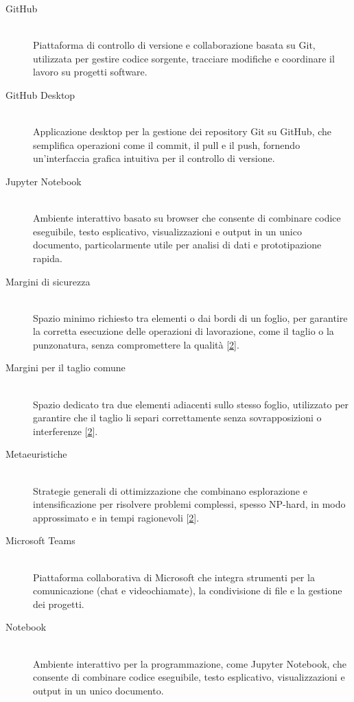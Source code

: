 \begin{description}
    \item[GitHub] \hfill \\
    Piattaforma di controllo di versione e collaborazione basata su Git, utilizzata per gestire codice sorgente, tracciare modifiche e coordinare il lavoro su progetti software.

    \item[GitHub Desktop] \hfil \\
    Applicazione desktop per la gestione dei repository Git su GitHub, che semplifica operazioni come il commit, il pull e il push, fornendo un'interfaccia grafica intuitiva per il controllo di versione.

    \item[Jupyter Notebook] \hfil \\
    Ambiente interattivo basato su browser che consente di combinare codice eseguibile, testo esplicativo, visualizzazioni e output in un unico documento, particolarmente utile per analisi di dati e prototipazione rapida.

    \item[Margini di sicurezza] \hfill \\ \hypertarget{gls2}{}
    Spazio minimo richiesto tra elementi o dai bordi di un foglio, per garantire la corretta esecuzione delle operazioni di lavorazione, come il taglio o la punzonatura, senza compromettere la qualità [\hyperlink{bibliografia}{2}].

    \item[Margini per il taglio comune] \hfill \\
    Spazio dedicato tra due elementi adiacenti sullo stesso foglio, utilizzato per garantire che il taglio li separi correttamente senza sovrapposizioni o interferenze [\hyperlink{bibliografia}{2}].

    \item[Metaeuristiche] \hfill \\
    Strategie generali di ottimizzazione che combinano esplorazione e intensificazione per risolvere problemi complessi, spesso NP-hard, in modo approssimato e in tempi ragionevoli [\hyperlink{bibliografia}{2}].

    \item[Microsoft Teams] \hfill \\
    Piattaforma collaborativa di Microsoft che integra strumenti per la comunicazione (chat e videochiamate), la condivisione di file e la gestione dei progetti.

    \item[Notebook] \hfill \\
    Ambiente interattivo per la programmazione, come Jupyter Notebook, che consente di combinare codice eseguibile, testo esplicativo, visualizzazioni e output in un unico documento.


\end{description}
